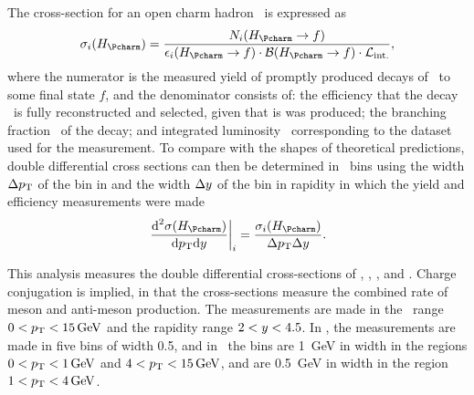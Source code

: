 The cross-section for an open charm hadron \PHc\ is expressed as
\begin{equation}
  \xsec_{i}(\PHc) = \frac{%
    N_{i}(\HcTof)
  }{%
    \eff_{i}(\HcTof)\cdot\bfrac(\HcTof)\cdot\intlumi
  },
  \label{eqn:prod:introduction:cross_section}
\end{equation}
where the numerator is the measured yield of promptly produced decays of \PHc\ 
to some final state $f$, and the denominator consists of: the efficiency that 
the decay \HcTof\ is fully reconstructed and selected, given that is was 
produced; the branching fraction \bfrac\ of the decay; and integrated 
luminosity \intlumi\ corresponding to the dataset used for the measurement.
To compare with the shapes of theoretical predictions, double differential 
cross sections can then be determined in \pTy\ bins using the width $\Delta p_{\text{T}}$ 
of the bin in \pT and the width $\Delta y$ of the bin in rapidity in 
which the yield and efficiency measurements were made
\begin{equation}
  \left.\frac{\text{d}^{2}\xsec(\PHc)}{\text{d}\pT\text{d}\rapidity}\right\rvert_{i}
    = \frac{\xsec_{i}(\PHc)}{\Delta\pT\Delta\rapidity}.
  \label{eqn:prod:introduction:differential_cross_section}
\end{equation}

This analysis measures the double differential cross-sections of \PDzero, \PDp, 
\PDsplus, and \PDstarp.
Charge conjugation is implied, in that the cross-sections measure the combined 
rate of meson and anti-meson production.
The measurements are made in the \pT\ range $0 < \pT < \SI{15}{\GeV}$ and the 
rapidity range $2 < y < 4.5$.
In \rapidity, the measurements are made in five bins of width 0.5, and in \pT\ 
the bins are \SI{1}{\GeV} in width in the regions $0 < \pT < \SI{1}{\GeV}$ and 
$4 < \pT < \SI{15}{\GeV}$, and are \SI{0.5}{\GeV} in width in the region $1 < 
\pT < \SI{4}{\GeV}$.

